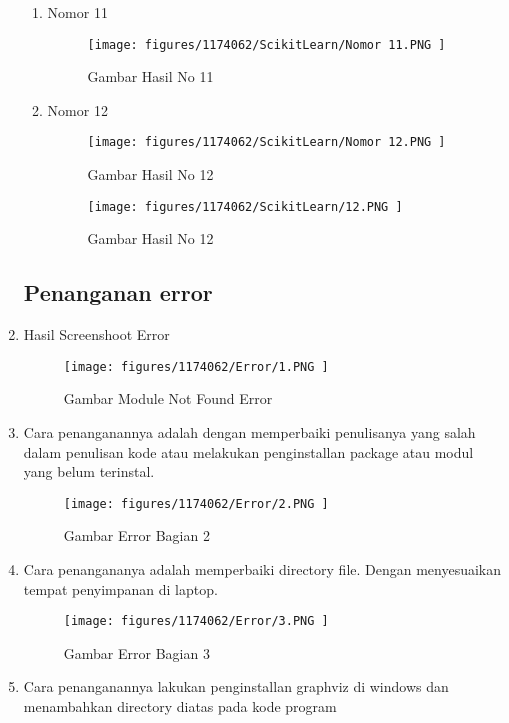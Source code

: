 \begin{enumerate}
\begin{enumerate}
\item Nomor 11
	\hfill\break
	
	
\begin{figure}[H]
	\texttt{[image: figures/1174062/ScikitLearn/Nomor 11.PNG ]}
	\centering
	\caption{Gambar Hasil No 11 }
\end{figure}	

\item Nomor 12
	\hfill\break
	
	
\begin{figure}[H]
	\texttt{[image: figures/1174062/ScikitLearn/Nomor 12.PNG ]}
	\centering
	\caption{Gambar Hasil No 12 }
\end{figure}
	
\begin{figure}[H]
	\texttt{[image: figures/1174062/ScikitLearn/12.PNG ]}
	\centering
	\caption{Gambar Hasil No 12 }
\end{figure}
	
\end{enumerate}

\subsection{Penanganan error}

\item Hasil Screenshoot Error
\begin{figure}[H]
	\texttt{[image: figures/1174062/Error/1.PNG ]}
	\centering
	\caption{Gambar Module Not Found Error }
\end{figure}
\item Cara penanganannya adalah dengan memperbaiki penulisanya yang salah dalam penulisan kode atau melakukan penginstallan package atau modul yang belum terinstal.\\

\begin{figure}[H]
\texttt{[image: figures/1174062/Error/2.PNG ]}
	\centering
	\caption{Gambar Error Bagian 2 }
\end{figure}
\item Cara penangananya adalah memperbaiki directory file. Dengan menyesuaikan tempat penyimpanan di laptop.\\

\begin{figure}[H]
\texttt{[image: figures/1174062/Error/3.PNG ]}
	\centering
	\caption{Gambar Error Bagian 3 }
\end{figure}
\item Cara penanganannya lakukan penginstallan graphviz di windows dan menambahkan directory diatas pada kode program


\end{enumerate}

